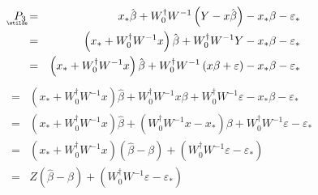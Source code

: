 \documentclass{article}
\begin{document}
\begin{eqnarray*}
\underaccent{\wtilde}{P}%
_{3} &=&x_{\ast }\hat{\beta}+W_{0}^{\dagger }W^{-1}\left( Y-x\hat{\beta}%
\right) -x_{\ast }\beta -\varepsilon _{\ast } \\
&=&\left( x_{\ast }+W_{0}^{\dagger }W^{-1}x\right) \hat{\beta}%
+W_{0}^{\dagger }W^{-1}Y-x_{\ast }\beta -\varepsilon _{\ast } \\
&=&\left( x_{\ast }+W_{0}^{\dagger }W^{-1}x\right) \hat{\beta}%
+W_{0}^{\dagger }W^{-1}\left( x\beta +\varepsilon \right) -x_{\ast }\beta
-\varepsilon _{\ast }
\end{eqnarray*}%
\begin{eqnarray*}
&=&\left( x_{\ast }+W_{0}^{\dagger }W^{-1}x\right) \hat{\beta}%
+W_{0}^{\dagger }W^{-1}x\beta +W_{0}^{\dagger }W^{-1}\varepsilon -x_{\ast
}\beta -\varepsilon _{\ast } \\
&=&\left( x_{\ast }+W_{0}^{\dagger }W^{-1}x\right) \hat{\beta}+\left(
W_{0}^{\dagger }W^{-1}x-x_{\ast }\right) \beta +W_{0}^{\dagger
}W^{-1}\varepsilon -\varepsilon _{\ast } \\
&=&\left( x_{\ast }+W_{0}^{\dagger }W^{-1}x\right) \left( \hat{\beta}-\beta
\right) +\left( W_{0}^{\dagger }W^{-1}\varepsilon -\varepsilon _{\ast
}\right) \\
&=&Z\left( \hat{\beta}-\beta \right) +\left( W_{0}^{\dagger
}W^{-1}\varepsilon -\varepsilon _{\ast }\right)
\end{eqnarray*}

\bigskip
\end{document}
